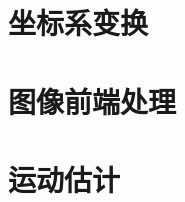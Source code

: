 \documentclass{article}
\begin{document}
\section{坐标系变换}
\section{图像前端处理}
\section{运动估计}
\end{document}
